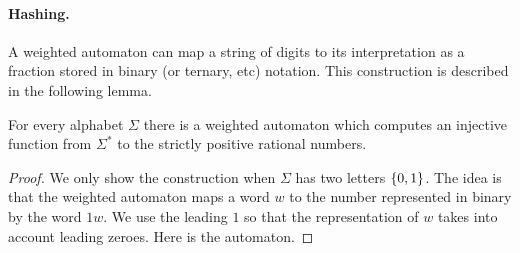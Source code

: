 \paragraph*{Hashing.} A weighted automaton can  map a string of digits to its interpretation as a fraction stored in binary (or ternary, etc) notation. This construction is described in the following lemma.

\begin{lemma}\label{lem:digit-lemma}
For every alphabet $\Sigma$ there is a  weighted automaton which computes an injective function from $\Sigma^*$ to the strictly positive rational numbers.
\end{lemma}
\begin{proof}We only show the construction when $\Sigma$ has two letters $\{0,1\}$. The idea is that the weighted automaton maps a word $w$ to the number represented in binary by the word  $1w$. We use the leading $1$ so that the representation of $w$  takes into account leading zeroes. Here is the automaton. 
 \end{proof}

